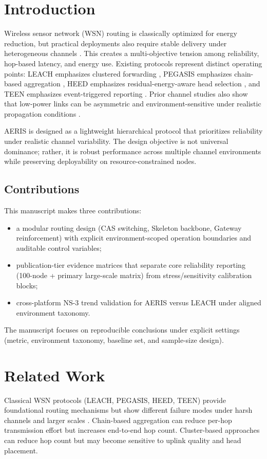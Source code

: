 ﻿\documentclass[sensors,article,submit,moreauthors,pdftex]{Definitions/mdpi}
\begin{document}
\section{Introduction}
Wireless sensor network (WSN) routing is classically optimized for energy reduction, but practical deployments also require stable delivery under heterogeneous channels \cite{Akyildiz2002Survey,Rault2016Energy,Kandris2020}. This creates a multi-objective tension among reliability, hop-based latency, and energy use. Existing protocols represent distinct operating points: LEACH emphasizes clustered forwarding \cite{Heinzelman2000LEACH}, PEGASIS emphasizes chain-based aggregation \cite{Lindsey2002PEGASIS}, HEED emphasizes residual-energy-aware head selection \cite{Younis2004HEED}, and TEEN emphasizes event-triggered reporting \cite{Manjeshwar2001TEEN}. Prior channel studies also show that low-power links can be asymmetric and environment-sensitive under realistic propagation conditions \cite{Zuniga2004,Zuniga2007Asymmetry,Baccour2012RLQE}.

AERIS is designed as a lightweight hierarchical protocol that prioritizes reliability under realistic channel variability. The design objective is not universal dominance; rather, it is robust performance across multiple channel environments while preserving deployability on resource-constrained nodes.

\subsection*{Contributions}
This manuscript makes three contributions:
\begin{itemize}
\item a modular routing design (CAS switching, Skeleton backbone, Gateway reinforcement) with explicit environment-scoped operation boundaries and auditable control variables;
\item publication-tier evidence matrices that separate core reliability reporting (100-node + primary large-scale matrix) from stress/sensitivity calibration blocks;
\item cross-platform NS-3 trend validation for AERIS versus LEACH under aligned environment taxonomy.
\end{itemize}
The manuscript focuses on reproducible conclusions under explicit settings (metric, environment taxonomy, baseline set, and sample-size design).

\section{Related Work}
Classical WSN protocols (LEACH, PEGASIS, HEED, TEEN) provide foundational routing mechanisms but show different failure modes under harsh channels and larger scales \cite{Heinzelman2002LEACH,Lindsey2002PEGASIS,Younis2004HEED,Kandris2020}. Chain-based aggregation can reduce per-hop transmission effort but increases end-to-end hop count. Cluster-based approaches can reduce hop count but may become sensitive to uplink quality and head placement.
\end{document}
